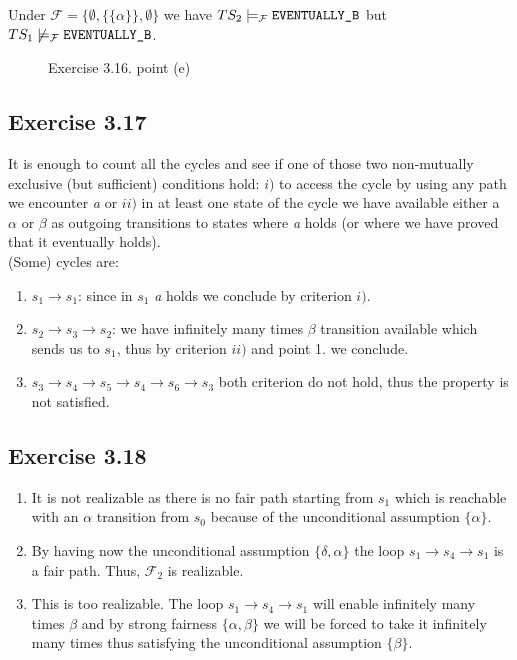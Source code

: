 \documentclass{article}
\begin{document}
\begin{enumerate}[label=(\alph*)]
		Under $\mathcal{F}=\{\emptyset, \{\{\alpha\}\}, \emptyset\}$ we have $TS_2 \models_{\mathcal{F}} \verb|EVENTUALLY_B|$ but $TS_1 \not \models_{\mathcal{F}} \verb|EVENTUALLY_B|$.
		\begin{figure}[ht]
			\centering
		\caption{Exercise 3.16. point (e)}
		\end{figure}
	\end{enumerate}
	\subsection*{Exercise 3.17}
	It is enough to count all the cycles and see if one of those two non-mutually exclusive (but sufficient) conditions hold: $i)$ to access the cycle by using any path we encounter \textit{a} or $ii)$ in at least one state of the cycle we have available either a $\alpha$ or $\beta$ as outgoing transitions to states where \textit{a} holds (or where we have proved that it eventually holds).
	\\
	(Some) cycles are:
	\begin{enumerate}[label=\arabic*]
		\item $s_1 \rightarrow s_1$: since in $s_1$ \textit{a} holds we conclude by criterion $i)$.
		\item $s_2\rightarrow s_3 \rightarrow s_2$: we have infinitely many times $\beta$ transition available which sends us to $s_1$, thus by criterion $ii)$ and point 1. we conclude. 
		\item $s_3 \rightarrow s_4 \rightarrow s_5 \rightarrow s_4 \rightarrow s_6 \rightarrow s_3$ both criterion do not hold, thus the property is not satisfied.
	\end{enumerate}
	\subsection*{Exercise 3.18}
	\begin{enumerate}[label=(\alph*)]
		\item It is not realizable as there is no fair path starting from $s_1$ which is reachable with an $\alpha$ transition from $s_0$ because of the unconditional assumption $\{\alpha\}$.
		\item By having now the unconditional assumption $\{\delta, \alpha\}$ the loop $s_1 \rightarrow s_4 \rightarrow s_1$ is a fair path. Thus, $\mathcal{F}_2$ is realizable.
		\item This is too realizable. The loop $s_1 \rightarrow s_4 \rightarrow s_1$ will enable infinitely many times $\beta$ and by strong fairness $\{\alpha, \beta\}$ we will be forced to take it infinitely many times thus satisfying the unconditional assumption $\{\beta \}$.
	\end{enumerate}
\end{document}
